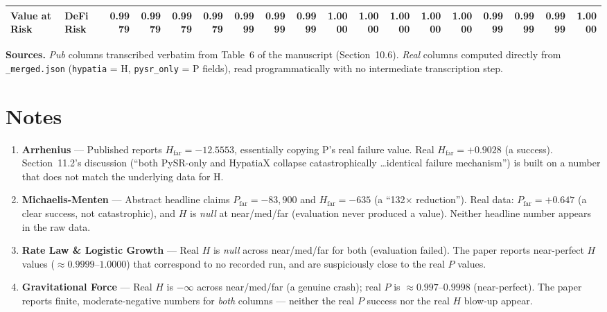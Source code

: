 \documentclass[10pt]{article}
\begin{document}
\begin{landscape}
\begin{adjustbox}{width=\linewidth,center}
\begin{tabular}{l l *{4}{r} *{4}{r} *{4}{r} *{4}{r}}
\textbf{Value at Risk} & DeFi Risk & 0.9979 & 0.9979 & \cellcolor{match}0.9979 & \cellcolor{match}0.9979 & 0.9999 & 0.9999 & \cellcolor{match}0.9999 & \cellcolor{match}1.0000 & 1.0000 & 1.0000 & \cellcolor{match}1.0000 & \cellcolor{match}1.0000 & 0.9999 & 0.9999 & \cellcolor{match}0.9999 & \cellcolor{match}1.0000 \\
\bottomrule
\end{tabular}
\end{adjustbox}

\bigskip

{\small
\textbf{Sources.} \emph{Pub} columns transcribed verbatim from Table~6 of the manuscript (Section~10.6). \emph{Real} columns computed directly from \texttt{\_merged.json} (\texttt{hypatia} = H, \texttt{pysr\_only} = P fields), read programmatically with no intermediate transcription step.
}

\section*{Notes}

\begin{enumerate}
\item \textbf{Arrhenius} --- Published reports $H_{\text{far}} = -12.5553$, essentially copying P's real failure value. Real $H_{\text{far}} = +0.9028$ (a success). Section~11.2's discussion (``both PySR-only and HypatiaX collapse catastrophically \ldots identical failure mechanism'') is built on a number that does not match the underlying data for H.

\item \textbf{Michaelis-Menten} --- Abstract headline claims $P_{\text{far}} = -83{,}900$ and $H_{\text{far}} = -635$ (a ``132$\times$ reduction''). Real data: $P_{\text{far}} = +0.647$ (a clear success, not catastrophic), and $H$ is \textit{null} at near/med/far (evaluation never produced a value). Neither headline number appears in the raw data.

\item \textbf{Rate Law \& Logistic Growth} --- Real $H$ is \textit{null} across near/med/far for both (evaluation failed). The paper reports near-perfect $H$ values ($\approx 0.9999$--$1.0000$) that correspond to no recorded run, and are suspiciously close to the real $P$ values.

\item \textbf{Gravitational Force} --- Real $H$ is $-\infty$ across near/med/far (a genuine crash); real $P$ is $\approx 0.997$--$0.9998$ (near-perfect). The paper reports finite, moderate-negative numbers for \emph{both} columns --- neither the real $P$ success nor the real $H$ blow-up appear.


\end{enumerate}
\end{landscape}
\end{document}
